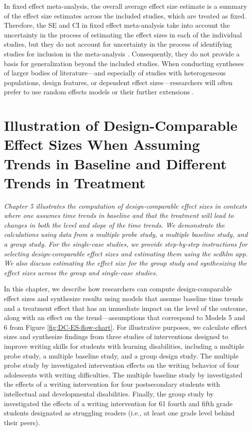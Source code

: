 \documentclass[
]{book}
\begin{document}
In fixed effect meta-analysis, the overall average effect size estimate is a summary of the effect size estimates across the included studies, which are treated as fixed. Therefore, the SE and CI in fixed effect meta-analysis take into account the uncertainty in the process of estimating the effect sizes in each of the individual studies, but they do not account for uncertainty in the process of identifying studies for inclusion in the meta-analysis \citep{konstantopoulos2019statistically, Rice_Higgins_Lumley_2018}. Consequently, they do not provide a basis for generalization beyond the included studies. When conducting syntheses of larger bodies of literature---and especially of studies with heterogeneous populations, design features, or dependent effect sizes---researchers will often prefer to use random effects models \citep{Hedges_Vevea_1998} or their further extensions \citep{PustejovskyTipton2021, van2013three}.

\hypertarget{illustrate-D-CES-Btrends}{%
\chapter{Illustration of Design-Comparable Effect Sizes When Assuming Trends in Baseline and Different Trends in Treatment}\label{illustrate-D-CES-Btrends}}

\emph{Chapter 5 illustrates the computation of design-comparable effect sizes in contexts where one assumes time trends in baseline and that the treatment will lead to changes in both the level and slope of the time trends. We demonstrate the calculations using data from a multiple probe study, a multiple baseline study, and a group study. For the single-case studies, we provide step-by-step instructions for selecting design-comparable effect sizes and estimating them using the \emph{scdhlm} app. We also discuss estimating the effect size for the group study and synthesizing the effect sizes across the group and single-case studies.}

In this chapter, we describe how researchers can compute design-comparable effect sizes and synthesize results using models that assume baseline time trends and a treatment effect that has an immediate impact on the level of the outcome, along with an effect on the trend---assumptions that correspond to Models 5 and 6 from Figure \ref{fig:DC-ES-flow-chart}. For illustrative purposes, we calculate effect sizes and synthesize findings from three studies of interventions designed to improve writing skills for students with learning disabilities, including a multiple probe study, a multiple baseline study, and a group design study. The multiple probe study by \citet{datchuk2016Writing} investigated intervention effects on the writing behavior of four adolescents with writing difficulties. The multiple baseline study by \citet{rodgers2021Effects} investigated the effects of a writing intervention for four postsecondary students with intellectual and developmental disabilities. Finally, the group study by \citet{hebert2018Writing} investigated the effects of a writing intervention for 61 fourth and fifth grade students designated as struggling readers (i.e., at least one grade level behind their peers).
\end{document}

